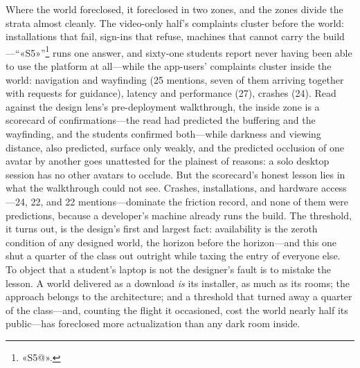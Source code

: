 Where the world foreclosed, it foreclosed in two zones, and the zones divide the strata almost cleanly. The video-only half's complaints cluster before the world: installations that fail, sign-ins that refuse, machines that cannot carry the build---``«S5»''\footnote{«S5@».} runs one answer, and sixty-one students report never having been able to use the platform at all---while the app-users' complaints cluster inside the world: navigation and wayfinding (25 mentions, seven of them arriving together with requests for guidance), latency and performance (27), crashes (24). Read against the design lens's pre-deployment walkthrough, the inside zone is a scorecard of confirmations---the read had predicted the buffering and the wayfinding, and the students confirmed both---while darkness and viewing distance, also predicted, surface only weakly, and the predicted occlusion of one avatar by another goes unattested for the plainest of reasons: a solo desktop session has no other avatars to occlude. But the scorecard's honest lesson lies in what the walkthrough could not see. Crashes, installations, and hardware access---24, 22, and 22 mentions---dominate the friction record, and none of them were predictions, because a developer's machine already runs the build. The threshold, it turns out, is the design's first and largest fact: availability is the zeroth condition of any designed world, the horizon before the horizon---and this one shut a quarter of the class out outright while taxing the entry of everyone else. To object that a student's laptop is not the designer's fault is to mistake the lesson. A world delivered as a download \textit{is} its installer, as much as its rooms; the approach belongs to the architecture; and a threshold that turned away a quarter of the class---and, counting the flight it occasioned, cost the world nearly half its public---has foreclosed more actualization than any dark room inside.

